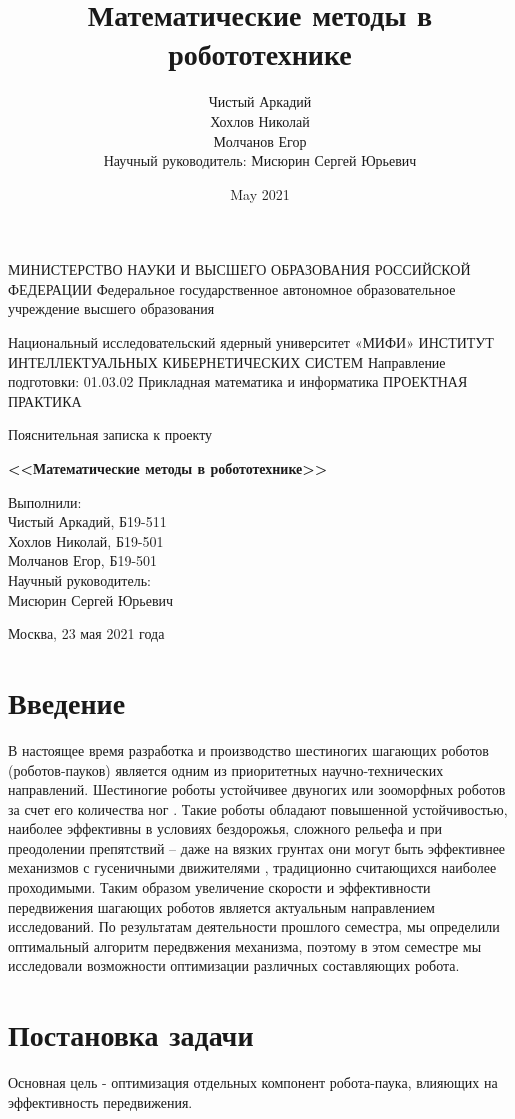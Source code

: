 \documentclass{article}
\title{Математические методы в робототехнике}
\author{Чистый Аркадий\\
Хохлов Николай\\
Молчанов Егор\\
Научный руководитель: Мисюрин Сергей Юрьевич}
\date{May 2021}
\begin{document}
\begin{center}
МИНИСТЕРСТВО НАУКИ И ВЫСШЕГО ОБРАЗОВАНИЯ РОССИЙСКОЙ ФЕДЕРАЦИИ
\vfill
Федеральное государственное автономное образовательное учреждение высшего образования

\bigskip
Национальный исследовательский ядерный университет «МИФИ»
\vfill
ИНСТИТУТ ИНТЕЛЛЕКТУАЛЬНЫХ КИБЕРНЕТИЧЕСКИХ СИСТЕМ
\vfill
Направление подготовки: 01.03.02 Прикладная математика и информатика
\vfill
ПРОЕКТНАЯ ПРАКТИКА
\vfill
{\large Пояснительная записка к проекту

\medskip
{\bfseries \Large <<Математические методы в робототехнике>>}}
\vfill
\end{center}
\begin{flushright}
Выполнили:\\Чистый Аркадий, Б19-511 \\Хохлов Николай, Б19-501\\Молчанов Егор, Б19-501\\
\medskip
Научный руководитель:\\ Мисюрин Сергей Юрьевич
\end{flushright}
\vfill
\vfill
\begin{center}
Москва, 23 мая 2021 года
\end{center}
\vfill
\vfill
\pagebreak

\tableofcontents
\newpage

\section{Введение}
В настоящее время разработка и производство шестиногих шагающих роботов (роботов-пауков) является одним из приоритетных научно-технических направлений. Шестиногие роботы устойчивее двуногих или зооморфных роботов за счет его количества ног \cite{ref1}. Такие роботы обладают повышенной устойчивостью, наиболее эффективны в условиях бездорожья, сложного рельефа и при преодолении препятствий – даже на вязких грунтах они могут быть эффективнее механизмов с гусеничными движителями \cite{ref2,ref3}, традиционно считающихся наиболее проходимыми. Таким образом увеличение скорости и эффективности передвижения шагающих роботов является актуальным направлением исследований. По результатам деятельности прошлого семестра, мы определили оптимальный алгоритм передвжения механизма, поэтому в этом семестре мы исследовали возможности оптимизации различных составляющих робота.
\newpage
\section{Постановка задачи}
Основная цель - оптимизация отдельных компонент робота-паука, влияющих на эффективность передвижения.
\end{document}
